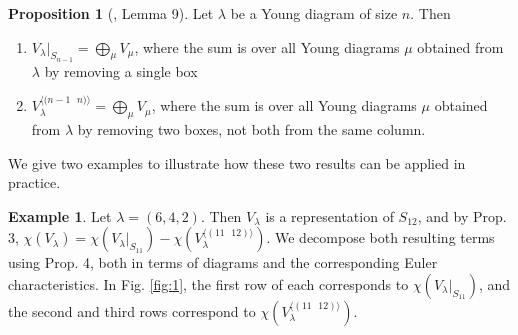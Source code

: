 \documentclass[12pt]{amsart}
\theoremstyle{definition}
\newtheorem{ex}{Example}
\newtheorem{prop}[thm]{Proposition}
\begin{document}
\begin{prop}[\cite{B}, Lemma 9]

Let $\lambda$ be a Young diagram of size $n$. Then

\begin{enumerate}

\item $V_{\lambda}|_{S_{n-1}} = \bigoplus _{\mu} V_{\mu}$, where the sum is over all Young diagrams $\mu$ obtained from $\lambda$ by removing a single box

\item $V_{\lambda}^{\langle \text{($n-1$ $n$)} \rangle} = \bigoplus _{\mu} V_{\mu}$, where the sum is over all Young diagrams $\mu$ obtained from $\lambda$ by removing two boxes, not both from the same column.

\end{enumerate}

\end{prop}

We give two examples to illustrate how these two results can be applied in practice. 

\begin{ex}

Let $\lambda = (6,4,2)$. Then $V_{\lambda}$ is a representation of $S_{12}$, and by Prop. 3, $\chi(V_{\lambda}) = \chi(V_{\lambda}|_{S_{11}}) - \chi(V_{\lambda}^{\langle (11 \text{ } 12) \rangle})$. We decompose both resulting terms using Prop. 4, both in terms of diagrams and the corresponding Euler characteristics. In Fig. \ref{fig:1}, the first row of each corresponds to $\chi(V_{\lambda}|_{S_{11}})$, and the second and third rows correspond to $\chi(V_{\lambda}^{\langle (11 \text{ } 12) \rangle})$.



\end{ex}
\end{document}
